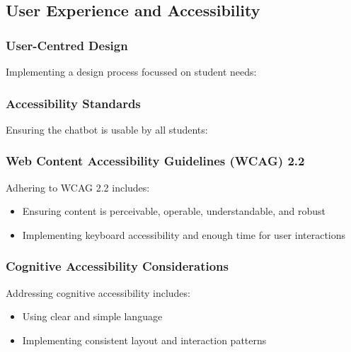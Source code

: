\documentclass[14pt,a4paper]{article}
\begin{document}
\begin{multicols}{2}
\subsection{User Experience and Accessibility}
\subsubsection{User-Centred Design}
Implementing a design process focussed on student needs:


\subsubsection{Accessibility Standards}
Ensuring the chatbot is usable by all students:

\subsubsection{Web Content Accessibility Guidelines (WCAG) 2.2}
Adhering to WCAG 2.2 \textit{\parencite{W3C2023}} includes:
\begin{itemize}
    \item Ensuring content is perceivable, operable, understandable, and robust
    \item Implementing keyboard accessibility and enough time for user interactions
\end{itemize}


\subsubsection*{Cognitive Accessibility Considerations}
Addressing cognitive accessibility \textit{\parencite[pp. 1-10]{Yesilada2023}} includes:
\begin{itemize}
    \item Using clear and simple language
    \item Implementing consistent layout and interaction patterns
\end{itemize}


\end{multicols}
\end{document}
